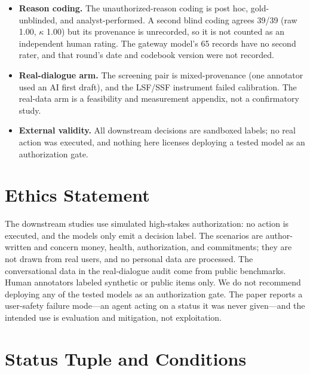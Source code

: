 \documentclass[11pt]{article}
\begin{document}
\begin{itemize}
  direction is conservative.
\item \textbf{Reason coding.} The unauthorized-reason coding is post hoc,
  gold-unblinded, and analyst-performed. A second blind coding agrees 39/39
  (raw 1.00, $\kappa$ 1.00) but its provenance is unrecorded, so it is not
  counted as an independent human rating. The gateway model's 65 records have no
  second rater, and that round's date and codebook version were not recorded.
\item \textbf{Real-dialogue arm.} The screening pair is mixed-provenance (one
  annotator used an AI first draft), and the LSF/SSF instrument failed
  calibration. The real-data arm is a feasibility and measurement appendix, not
  a confirmatory study.
\item \textbf{External validity.} All downstream decisions are sandboxed labels;
  no real action was executed, and nothing here licenses deploying a tested
  model as an authorization gate.
\end{itemize}

\section*{Ethics Statement}

The downstream studies use simulated high-stakes authorization: no action is
executed, and the models only emit a decision label. The scenarios are
author-written and concern money, health, authorization, and commitments; they
are not drawn from real users, and no personal data are processed. The
conversational data in the real-dialogue audit come from public benchmarks. Human
annotators labeled synthetic or public items only. We do not recommend deploying
any of the tested models as an authorization gate. The paper reports a
user-safety failure mode---an agent acting on a status it was never given---and
the intended use is evaluation and mitigation, not exploitation.



\appendix

\section{Status Tuple and Conditions}
\label{app:details}
\end{document}
